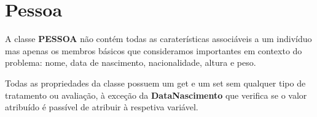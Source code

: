 \section{Pessoa}
A classe \textbf{PESSOA} não contém todas as caraterísticas associáveis a um indivíduo mas apenas os membros básicos que consideramos importantes em contexto do problema: nome, data de nascimento, nacionalidade, altura e peso.


Todas as propriedades da classe possuem um get e um set sem qualquer tipo de tratamento ou avaliação, 
à exceção da \textbf{DataNascimento} que verifica se o valor atribuído é passível de atribuir à respetiva 
variável.

